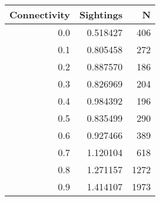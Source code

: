 \begin{tabular}{rrr}
\toprule
 Connectivity &  Sightings &    N \\
\midrule
          0.0 &   0.518427 &  406 \\
          0.1 &   0.805458 &  272 \\
          0.2 &   0.887570 &  186 \\
          0.3 &   0.826969 &  204 \\
          0.4 &   0.984392 &  196 \\
          0.5 &   0.835499 &  290 \\
          0.6 &   0.927466 &  389 \\
          0.7 &   1.120104 &  618 \\
          0.8 &   1.271157 & 1272 \\
          0.9 &   1.414107 & 1973 \\
\bottomrule
\end{tabular}
